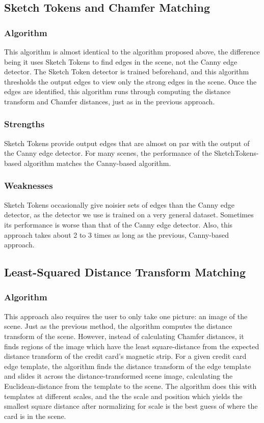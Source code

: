 \documentclass[10pt,twocolumn,letterpaper]{article}
\begin{document}
\subsection{Sketch Tokens and Chamfer Matching}
\subsubsection{Algorithm}
	This algorithm is almost identical to the algorithm proposed above, the difference being it uses Sketch Tokens to find edges in the scene, not the Canny edge detector. The Sketch Token detector is trained beforehand, and this algorithm thresholds the output edges to view only the strong edges in the scene. Once the edges are identified, this algorithm runs through computing the distance transform and Chamfer distances, just as in the previous approach.
\subsubsection{Strengths}
	Sketch Tokens provide output edges that are almost on par with the output of the Canny edge detector. For many scenes, the performance of the SketchTokens-based algorithm matches the Canny-based algorithm.
\subsubsection{Weaknesses}
	Sketch Tokens occasionally give noisier sets of edges than the Canny edge detector, as the detector we use is trained on a very general dataset. Sometimes its performance is worse than that of the Canny edge detector. Also, this approach takes about 2 to 3 times as long as the previous, Canny-based approach. 

\subsection{Least-Squared Distance Transform Matching}
\subsubsection{Algorithm}
This approach also requires the user to only take one picture: an image of the scene. Just as the previous method, the algorithm computes the distance transform of the scene. However, instead of calculating Chamfer distances, it finds regions of the image which have the least square-distance from the expected distance transform of the credit card’s magnetic strip. For a given credit card edge template, the algorithm finds the distance transform of the edge template and slides it across the distance-transformed scene image, calculating the Euclidean-distance from the template to the scene. The algorithm does this with templates at different scales, and the the scale and position which yields the smallest square distance after normalizing for scale is the best guess of where the card is in the scene. 
\end{document}
